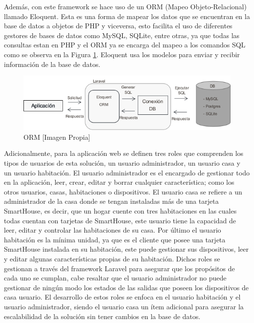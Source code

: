 Además, con este framework se hace uso de un ORM (Mapeo Objeto-Relacional) llamado Eloquent. Esta es una forma de mapear los datos que se encuentran en la base de datos a objetos de PHP y viceversa, esto facilita el uso de diferentes gestores de bases de datos como MySQL, SQLite, entre otras, ya que todas las consultas estan en PHP y el ORM ya se encarga del mapeo a los comandos SQL como se observa en la Figura \ref{fig:orm}. Eloquent usa los modelos para enviar y recibir información de la base de datos\cite{Eloq}.\\

\begin{figure}[H]
	\centering
	\caption[ORM]{ORM [Imagen Propia]}
	\label{fig:orm}
	\includegraphics[width=0.7\linewidth]{Imagenes/ORM}
\end{figure}

Adicionalmente, para la aplicación web se definen tres roles que comprenden los tipos de usuarios de esta solución, un usuario administrador, un usuario casa y un usuario habitación. El usuario administrador es el encargado de gestionar todo en la aplicación, leer, crear, editar y borrar cualquier característica; como los otros usuarios, casas, habitaciones o dispositivos. El usuario casa se refiere a un administrador de la casa donde se tengan instaladas más de una tarjeta SmartHouse, es decir, que un hogar cuente con tres habitaciones en las cuales todas cuentan con tarjetas de SmartHouse, este usuario tiene la capacidad de leer, editar y controlar las habitaciones de su casa. Por último el usuario habitación es la mínima unidad, ya que es el cliente que posee una tarjeta SmartHouse instalada en su habitación, este puede gestionar sus dispositivos, leer y editar algunas características propias de su habitación. Dichos roles se gestionan a través del framework Laravel para asegurar que los propósitos de cada uno se cumplan, cabe resaltar que el usuario administrador no puede gestionar de ningún modo los estados de las salidas que poseen los dispositivos de casa usuario. El desarrollo de estos roles se enfoca en el usuario habitación y el usuario administrador, siendo el usuario casa un ítem adicional para asegurar la escalabilidad de la solución sin tener cambios en la base de datos.\\

